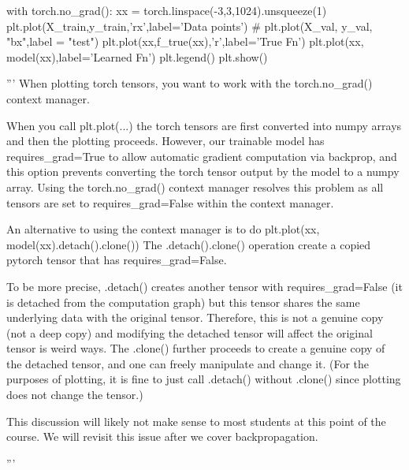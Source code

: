 \documentclass[10pt]{article}
\begin{document}
\begin{python}
    
    
    with torch.no_grad():
        xx = torch.linspace(-3,3,1024).unsqueeze(1)
        plt.plot(X_train,y_train,'rx',label='Data points')
        # plt.plot(X_val, y_val, "bx",label = "test")
        plt.plot(xx,f_true(xx),'r',label='True Fn')
        plt.plot(xx, model(xx),label='Learned Fn')
    plt.legend()
    plt.show()
    
    '''
    When plotting torch tensors, you want to work with the
    torch.no_grad() context manager.
    
    When you call plt.plot(...) the torch tensors are first converted into
    numpy arrays and then the plotting proceeds.
    However, our trainable model has requires_grad=True to allow automatic
    gradient computation via backprop, and this option prevents 
    converting the torch tensor output by the model to a numpy array.
    Using the torch.no_grad() context manager resolves this problem
    as all tensors are set to requires_grad=False within the context manager.
    
    An alternative to using the context manager is to do 
    plt.plot(xx, model(xx).detach().clone())
    The .detach().clone() operation create a copied pytorch tensor that
    has requires_grad=False.
    
    To be more precise, .detach() creates another tensor with requires_grad=False
    (it is detached from the computation graph) but this tensor shares the same
    underlying data with the original tensor. Therefore, this is not a genuine
    copy (not a deep copy) and modifying the detached tensor will affect the 
    original tensor is weird ways. The .clone() further proceeds to create a
    genuine copy of the detached tensor, and one can freely manipulate and change it.
    (For the purposes of plotting, it is fine to just call .detach() without
    .clone() since plotting does not change the tensor.)
    
    This discussion will likely not make sense to most students at this point of the course.
    We will revisit this issue after we cover backpropagation.
    
    '''
    
    \end{python}
\end{document}
